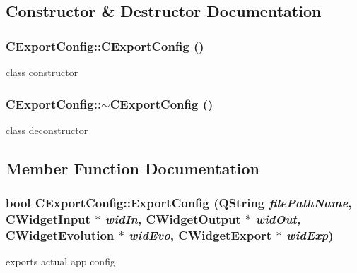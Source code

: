 \subsection{Constructor \& Destructor Documentation}
\hypertarget{classCExportConfig_a8165a6c6e0c15d1b63b059d10cde6d44}{
\subsubsection[{CExportConfig}]{\setlength{\rightskip}{0pt plus 5cm}CExportConfig::CExportConfig ()}}
\label{classCExportConfig_a8165a6c6e0c15d1b63b059d10cde6d44}
class constructor \hypertarget{classCExportConfig_a8469245d21428fb2ceac04798ea14caa}{
\subsubsection[{$\sim$CExportConfig}]{\setlength{\rightskip}{0pt plus 5cm}CExportConfig::$\sim$CExportConfig ()}}
\label{classCExportConfig_a8469245d21428fb2ceac04798ea14caa}
class deconstructor 

\subsection{Member Function Documentation}
\hypertarget{classCExportConfig_ace3fcad02cfbaa2bfe5bb9cb4610052a}{
\subsubsection[{ExportConfig}]{\setlength{\rightskip}{0pt plus 5cm}bool CExportConfig::ExportConfig (QString {\em filePathName}, \/  {\bf CWidgetInput} $\ast$ {\em widIn}, \/  {\bf CWidgetOutput} $\ast$ {\em widOut}, \/  {\bf CWidgetEvolution} $\ast$ {\em widEvo}, \/  {\bf CWidgetExport} $\ast$ {\em widExp})}}
\label{classCExportConfig_ace3fcad02cfbaa2bfe5bb9cb4610052a}
exports actual app config


